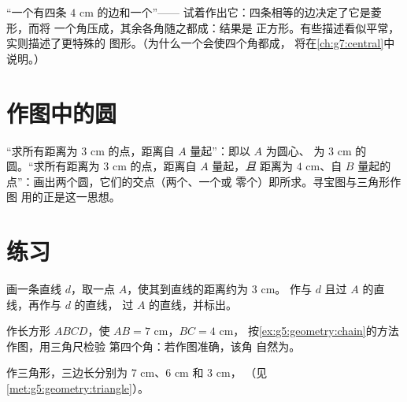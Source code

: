 \begin{example}[由描述辨认图形]\label{ex:g5:geometry:recognize}
“一个有四条 $4$ cm 的边和一个”——
试着作出它：四条相等的边决定了它是菱形，而将
一个角压成，其余各角随之都成：结果是
正方形。有些描述看似平常，实则描述了更特殊的
图形。（为什么一个会使四个角都成，
将在\cref{ch:g7:central}中说明。）
\end{example}

\section{作图中的圆}

\begin{example}[把圆当作工具]\label{ex:g5:geometry:circle}
“求所有距离为 $3$ cm 的点，距离自 $A$ 量起”：即以 $A$ 为圆心、
为 $3$ cm 的圆。“求所有距离为 $3$ cm 的点，距离自 $A$ 量起，\emph{且}
距离为 $4$ cm、自 $B$ 量起的点”：画出两个圆，它们的交点（两个、一个或
零个）即所求。寻宝图与三角形作图
用的正是这一思想。
\end{example}

\section{练习}

\begin{exercise}[$\star$]\label{exo:g5:geometry:1}
画一条直线 $d$，取一点 $A$，使其到直线的距离约为 $3$ cm。
作与 $d$ 且过 $A$ 的直线，再作与 $d$ 的直线，
过 $A$ 的直线，并标出。
\end{exercise}

\begin{exercise}[$\star$]\label{exo:g5:geometry:2}
作长方形 $ABCD$，使 $AB = 7$ cm，$BC = 4$ cm，
按\cref{ex:g5:geometry:chain}的方法作图，用三角尺检验
第四个角：若作图准确，该角
自然为。
\end{exercise}

\begin{exercise}[$\star$]\label{exo:g5:geometry:3}
作三角形，三边长分别为 $7$ cm、$6$ cm 和 $3$ cm，
（见\cref{met:g5:geometry:triangle}）。
\end{exercise}

